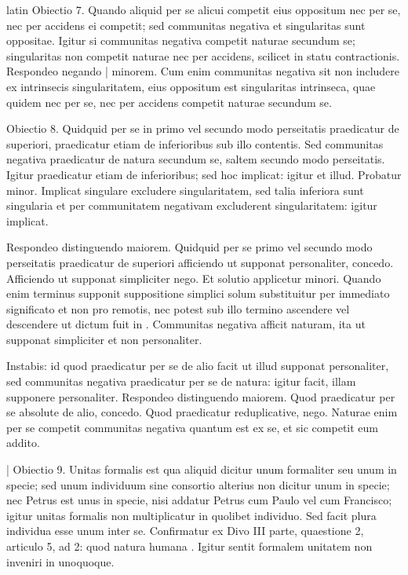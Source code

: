 \begin{otherlanguage*}{latin}
\pstart
 Obiectio 7. Quando aliquid per se alicui competit eius oppositum nec per se, nec per accidens ei competit; sed communitas negativa et singularitas sunt oppositae. Igitur si communitas negativa competit naturae secundum se; singularitas non competit naturae nec per accidens, scilicet in statu contractionis. Respondeo negando \textnormal{|} minorem. Cum enim communitas negativa sit non includere ex intrinsecis singularitatem, eius oppositum est singularitas intrinseca, quae quidem nec per se, nec per accidens competit naturae secundum se. 
\pend

\pstart
 Obiectio 8. Quidquid per se in primo vel secundo modo perseitatis praedicatur de superiori, praedicatur etiam de inferioribus sub illo contentis. Sed communitas negativa praedicatur de natura secundum se, saltem secundo modo perseitatis. Igitur praedicatur etiam de inferioribus; sed hoc implicat: igitur et illud. Probatur minor. Implicat singulare excludere singularitatem, sed talia inferiora sunt singularia et per communitatem negativam excluderent singularitatem: igitur implicat. 
\pend

\pstart
 Respondeo distinguendo maiorem. Quidquid per se primo vel secundo modo perseitatis praedicatur de superiori afficiendo ut supponat personaliter, concedo. Afficiendo ut supponat simpliciter nego. Et solutio applicetur minori. Quando enim terminus supponit suppositione simplici solum substituitur per immediato significato et non pro remotis, nec potest sub illo termino ascendere vel descendere ut dictum fuit in    . Communitas negativa afficit naturam, ita ut supponat simpliciter et non personaliter. 
\pend

\pstart
 Instabis: id quod praedicatur per se de alio facit ut illud supponat personaliter, sed communitas negativa praedicatur per se de natura: igitur facit, illam supponere personaliter. Respondeo distinguendo maiorem. Quod praedicatur per se absolute de alio, concedo. Quod praedicatur reduplicative, nego. Naturae enim per se competit communitas negativa quantum est ex se, et sic competit eum addito. 
\pend

\pstart
 \textnormal{|}  Obiectio 9. Unitas formalis est qua aliquid dicitur unum formaliter seu unum in specie; sed unum individuum sine consortio alterius non dicitur unum in specie; nec Petrus est unus in specie, nisi addatur Petrus cum Paulo vel cum Francisco; igitur unitas formalis non multiplicatur in quolibet individuo. Sed facit plura individua esse unum inter se. Confirmatur ex Divo  III parte, quaestione 2, articulo 5, ad 2: quod natura humana . Igitur sentit formalem unitatem non inveniri in unoquoque. 
\pend


\end{otherlanguage*}
